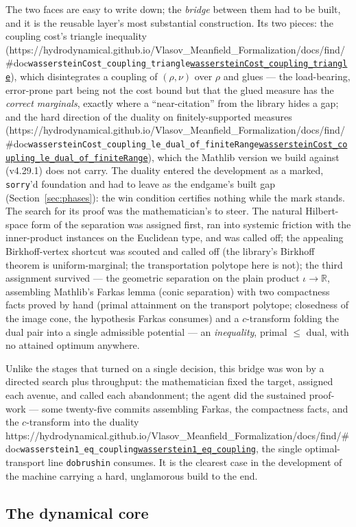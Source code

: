 \documentclass[11pt]{article}
\theoremstyle{plain}
\theoremstyle{definition}
\theoremstyle{remark}
\newcommand{\R}{\mathbb{R}}
\newcommand{\lean}[1]{\texttt{#1}}
\newcommand{\leanbaseurl}{https://hydrodynamical.github.io/Vlasov\_Meanfield\_Formalization/docs/find/\#doc}
\newcommand{\leanlink}[1]{\ifx\leanbaseurl\empty\lean{#1}\else\href{\leanbaseurl/Vlasov.#1}{\lean{#1}}\fi}
\begin{document}
\medskip\noindent
The two faces are easy to write down; the \emph{bridge} between them had to be built,
and it is the reusable layer's most substantial construction. Its two pieces: the
coupling cost's triangle inequality
(\leanlink{wassersteinCost\_coupling\_triangle}), which disintegrates a coupling of
$(\rho,\nu)$ over $\rho$ and glues --- the load-bearing, error-prone part being not
the cost bound but that the glued measure has the \emph{correct marginals}, exactly
where a ``near-citation'' from the library hides a gap; and the hard direction of
the duality on finitely-supported measures
(\leanlink{wassersteinCost\_coupling\_le\_dual\_of\_finiteRange}), which the Mathlib
version we build against (v4.29.1) does not carry. The duality entered the
development as a marked, \lean{sorry}'d foundation and had to leave as the
endgame's built gap (Section~\ref{sec:phases}): the win condition certifies nothing
while the mark stands. The search for its proof was the mathematician's to steer.
The natural Hilbert-space form of the separation was assigned first, ran into
systemic friction with the inner-product instances on the Euclidean type, and was
called off; the appealing Birkhoff-vertex shortcut was scouted and called off (the
library's Birkhoff theorem is uniform-marginal; the transportation polytope here is
not); the third assignment survived --- the geometric separation on the plain
product $\iota\to\R$, assembling Mathlib's Farkas lemma (conic separation)
\cite{mathlib} with two compactness facts proved by hand (primal attainment on the
transport polytope; closedness of the image cone, the hypothesis Farkas consumes)
and a $c$-transform folding the dual pair into a single admissible potential --- an
\emph{inequality}, primal $\le$ dual, with no attained optimum anywhere.

Unlike the stages that turned on a single decision, this bridge was won by a
directed search plus throughput: the mathematician fixed the
target, assigned each avenue, and called each abandonment; the agent did the
sustained proof-work --- some twenty-five commits assembling Farkas, the compactness
facts, and the $c$-transform into the duality \leanlink{wasserstein1\_eq\_coupling},
the single optimal-transport line \lean{dobrushin} consumes. It is the clearest case
in the development of the machine carrying a hard, unglamorous build to the end.

\subsection{The dynamical core}\label{ssec:dynamical-core}
\end{document}
